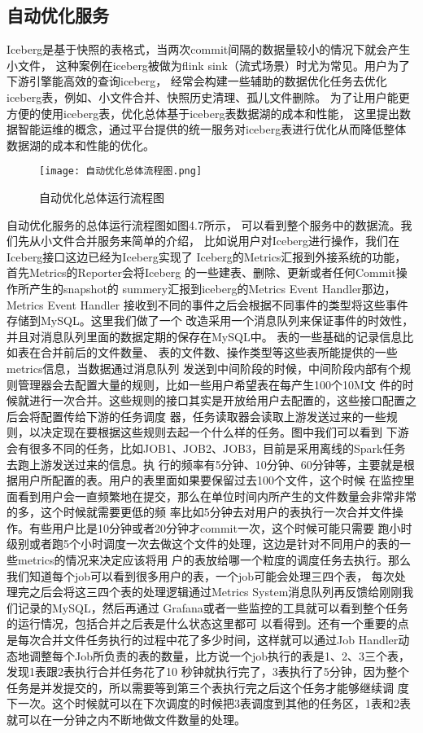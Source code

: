 \subsection{自动优化服务}

Iceberg是基于快照的表格式，当两次commit间隔的数据量较小的情况下就会产生小文件，
这种案例在iceberg被做为flink sink（流式场景）时尤为常见。用户为了下游引擎能高效的查询iceberg，
经常会构建一些辅助的数据优化任务去优化iceberg表，例如、小文件合并、快照历史清理、孤儿文件删除。
为了让用户能更方便的使用iceberg表，优化总体基于iceberg表数据湖的成本和性能，
这里提出数据智能运维的概念，通过平台提供的统一服务对iceberg表进行优化从而降低整体数据湖的成本和性能的优化。

\begin{figure}[h]
  \centering
  \texttt{[image: 自动优化总体流程图.png]}
  \caption{自动优化总体运行流程图}
  \label{fig:badge}
\end{figure}

自动优化服务的总体运行流程图如图4.7所示，
可以看到整个服务中的数据流。我们先从小文件合并服务来简单的介绍，
比如说用户对Iceberg进行操作，我们在Iceberg接口这边已经为Iceberg实现了
Iceberg的Metrics汇报到外接系统的功能，首先Metrics的Reporter会将Iceberg
的一些建表、删除、更新或者任何Commit操作所产生的snapshot的
summery汇报到iceberg的Metrics Event Handler那边，Metrics Event Handler
接收到不同的事件之后会根据不同事件的类型将这些事件存储到MySQL。这里我们做了一个
改造采用一个消息队列来保证事件的时效性，并且对消息队列里面的数据定期的保存在MySQL中。
表的一些基础的记录信息比如表在合并前后的文件数量、
表的文件数、操作类型等这些表所能提供的一些metrics信息，当数据通过消息队列
发送到中间阶段的时候，中间阶段内部有个规则管理器会去配置大量的规则，比如一些用户希望表在每产生100个10M文
件的时候就进行一次合并。这些规则的接口其实是开放给用户去配置的，这些接口配置之后会将配置传给下游的任务调度
器，任务读取器会读取上游发送过来的一些规则，以决定现在要根据这些规则去起一个什么样的任务。图中我们可以看到
下游会有很多不同的任务，比如JOB1、JOB2、JOB3，目前是采用离线的Spark任务去跑上游发送过来的信息。执
行的频率有5分钟、10分钟、60分钟等，主要就是根据用户所配置的表。用户的表里面如果要保留过去100个文件，这个时候
在监控里面看到用户会一直频繁地在提交，那么在单位时间内所产生的文件数量会非常非常的多，这个时候就需要更低的频
率比如5分钟去对用户的表执行一次合并文件操作。有些用户比是10分钟或者20分钟才commit一次，这个时候可能只需要
跑小时级别或者跑5个小时调度一次去做这个文件的处理，这边是针对不同用户的表的一些metrics的情况来决定应该将用
户的表放给哪一个粒度的调度任务去执行。那么我们知道每个job可以看到很多用户的表，一个job可能会处理三四个表，
每次处理完之后会将这三四个表的处理逻辑通过Metrics System消息队列再反馈给刚刚我们记录的MySQL，然后再通过
Grafana或者一些监控的工具就可以看到整个任务的运行情况，包括合并之后表是什么状态这里都可
以看得到。还有一个重要的点是每次合并文件任务执行的过程中花了多少时间，这样就可以通过Job Handler动
态地调整每个Job所负责的表的数量，比方说一个job执行的表是1、2、3三个表，发现1表跟2表执行合并任务花了10
秒钟就执行完了，3表执行了5分钟，因为整个任务是并发提交的，所以需要等到第三个表执行完之后这个任务才能够继续调
度下一次。这个时候就可以在下次调度的时候把3表调度到其他的任务区，1表和2表就可以在一分钟之内不断地做文件数量的处理。

